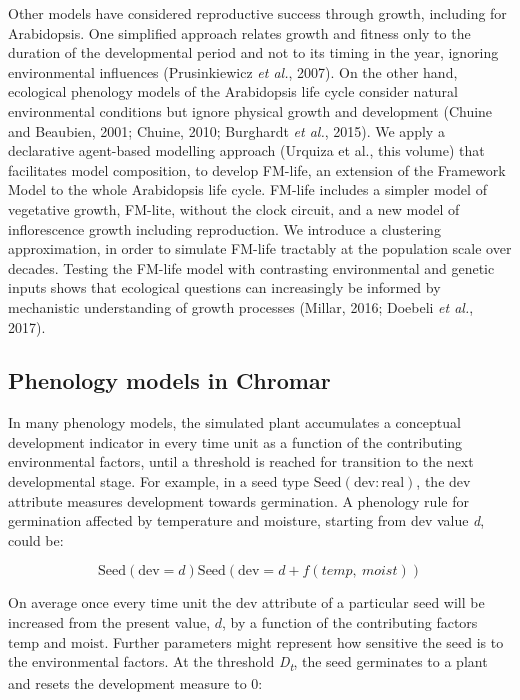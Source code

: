 \documentclass[phd]{infthesis}
\begin{document}
Other models have considered reproductive success through growth,
including for Arabidopsis. One simplified approach relates growth and
fitness only to the duration of the developmental period and not to its
timing in the year, ignoring environmental influences (Prusinkiewicz
\emph{et al.}, 2007). On the other hand, ecological phenology models of
the Arabidopsis life cycle consider natural environmental conditions but
ignore physical growth and development (Chuine and Beaubien, 2001;
Chuine, 2010; Burghardt \emph{et al.}, 2015). We apply a declarative
agent-based modelling approach (Urquiza et al., this volume) that
facilitates model composition, to develop FM-life, an extension of the
Framework Model to the whole Arabidopsis life cycle. FM-life includes a
simpler model of vegetative growth, FM-lite, without the clock circuit,
and a new model of inflorescence growth including reproduction. We
introduce a clustering approximation, in order to simulate FM-life
tractably at the population scale over decades. Testing the FM-life
model with contrasting environmental and genetic inputs shows that
ecological questions can increasingly be informed by mechanistic
understanding of growth processes (Millar, 2016; Doebeli \emph{et al.},
2017).

\subsection{Phenology models in
  Chromar}
\label{phenology-models-in-chromar}

In many phenology models, the simulated plant accumulates a conceptual
development indicator in every time unit as a function of the
contributing environmental factors, until a threshold is reached for
transition to the next developmental stage. For example, in a seed type
\(\text{Seed}(\text{dev}:\text{real})\), the dev attribute measures
development towards germination. A phenology rule for germination
affected by temperature and moisture, starting from dev value \emph{d},
could be:

\[\text{Seed}\left( \text{dev} = d \right){}\text{Seed}(\text{dev} = d + f\left( temp,\ moist \right))\]

On average once every time unit the \(\text{dev}\) attribute of a
particular seed will be increased from the present value, \(d\), by a
function of the contributing factors \(\text{temp}\) and
\(\text{moist}\). Further parameters might represent how sensitive the
seed is to the environmental factors. At the threshold
\emph{D\textsubscript{t}}, the seed germinates to a plant and resets the
development measure to 0:
\end{document}
